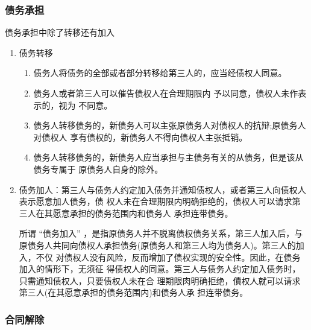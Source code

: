 \documentclass[UTF8,12pt]{ctexart}
\numberwithin{equation}{section} %
\numberwithin{figure}{section}
\numberwithin{table}{section}
\begin{document}
	\subsubsection{债务承担}
	债务承担中除了转移还有加入
	\begin{enumerate}
		\item 债务转移 
		\begin{enumerate}
			\item 债务人将债务的全部或者部分转移给第三人的，应当经债权人同意。
			
			\item 债务人或者第三人可以催告债权人在合理期限内 予以同意，债权人未作表示的，视为 不同意。
			
			\item 债务人转移债务的，新债务人可以主张原债务人对债权人的抗辩;原债务人对债权人 享有债权的，新债务人不得向债权人主张抵销。
			
			\item 债务人转移债务的，新债务人应当承担与主债务有关的从债务，但是该从债务专属于 原债务人自身的除外。
		\end{enumerate}
		
		\item 债务加人：第三人与债务人约定加入债务并通知债权人，或者第三人向债权人表示愿意加人债务，债 权人未在合理期限内明确拒绝的，债权人可以请求第 三人在其愿意承担的债务范围内和债务人 承担连带债务。
		
		所谓 “债务加入” ，是指原债务人并不脱离债权债务关系，第三人加入后，与 原债务人共同向债权人承担债务(原债务人和第三人均为债务人)。第三人的加入，不仅 对债权人没有风险，反而增加了债权实现的安全性。因此，在债务加入的情形下，无须征 得债权人的同意。第三人与债务人约定加入债务时，只需通知债权人，只要债权人未在合 理期限肉明确拒绝，債权人就可以请求第三人(在其愿意承担的债务范围内)和债务人承 担连带债务。
	\end{enumerate}
	
	
	\subsubsection{合同解除}
\end{document}
